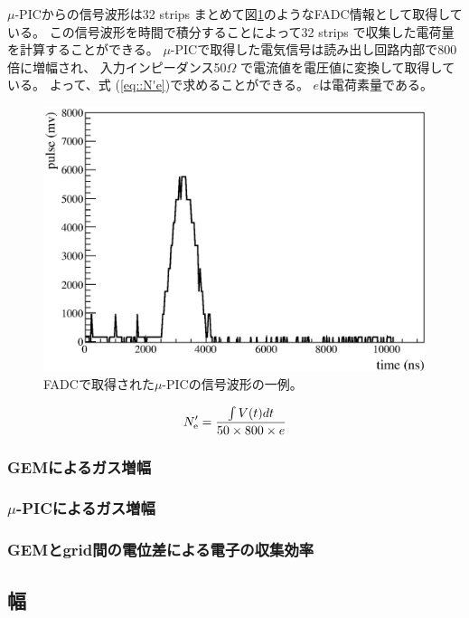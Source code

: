 $\mu$-PICからの信号波形は32 strips まとめて図\ref{fig::FADC_waveform}のようなFADC情報として取得している。
この信号波形を時間で積分することによって32 strips で収集した電荷量を計算することができる。
$\mu$-PICで取得した電気信号は読み出し回路内部で800倍に増幅され、
入力インピーダンス50$\Omega$ で電流値を電圧値に変換して取得している。
よって、式 (\ref{eq::N'e})で求めることができる。
$e$は電荷素量である。
\begin{figure}
  \centering
  \includegraphics[clip, width=0.7\columnwidth]{eps/0101_waveform_8.eps}
  \caption{FADCで取得された$\mu$-PICの信号波形の一例。}
  \label{fig::FADC_waveform}
\end{figure}
\begin{equation}
  N'_{\rm e} = \frac{\int V (t) dt}{ 50 \times 800 \times e}
  \label{eq::N'e}
\end{equation}

\subsubsection{GEMによるガス増幅}

\subsubsection{$\mu$-PICによるガス増幅}

\subsubsection{GEMとgrid間の電位差による電子の収集効率}

\subsection{幅}

